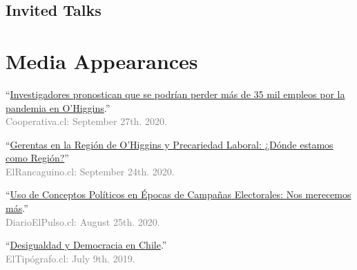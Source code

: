 \documentclass[letterpaper]{article}
\renewenvironment{itemize}{
  \begin{list}{}{
    \setlength{\leftmargin}{1.5em}
  }
}{
  \end{list}
}
\begin{document}
\subsection*{Invited Talks}

{\unskip}


\section*{Media Appearances}

  \begin{itemize}
    \item[\textcolor{gray}{\textbullet}] ``\href{https://cooperativa.cl/noticias/pais/region-de-ohiggins/investigadores-pronostican-que-se-podrian-perder-mas-de-35-mil-empleos/2020-09-27/110705.html}{Investigadores pronostican que se podr\'ian perder m\'as de 35 mil empleos por la pandemia en O'Higgins}.''\\\textcolor{gray}{Cooperativa.cl: September 27th. 2020.}
    \item[\textcolor{gray}{\textbullet}] ``\href{https://www.elrancaguino.cl/2020/09/24/gerentas-en-la-region-de-ohiggins-y-precariedad-laboral-donde-estamos-como-region/}{Gerentas en la Regi\'on de O'Higgins y Precariedad Laboral: ¿D\'onde estamos como Regi\'on?}''\\\textcolor{gray}{ElRancaguino.cl: September 24th. 2020.}
    \item[\textcolor{gray}{\textbullet}] ``\href{https://www.diarioelpulso.cl/2020/08/25/uso-de-conceptos-politicos-en-epocas-de-campanas-electorales-nos-merecemos-mas/}{Uso de Conceptos Pol\'iticos en \'Epocas de Campa\~nas Electorales: Nos merecemos m\'as}.''\\\textcolor{gray}{DiarioElPulso.cl: August 25th. 2020.}
    \item[\textcolor{gray}{\textbullet}] ``\href{https://eltipografo.cl/2019/07/desigualdad-y-democracia-en-chile}{Desigualdad y Democracia en Chile}.''\\\textcolor{gray}{ElTip\'ografo.cl: July 9th. 2019.}


  \end{itemize}

\end{document}
